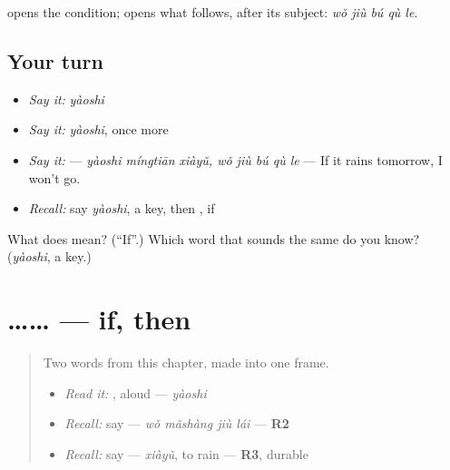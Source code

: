 \begin{grammarlens}[title={What you've built}]
 opens the condition;  opens what follows, after its subject: \textbf{} \emph{wǒ jiù bú qù le}.
\end{grammarlens}

\subsection*{Your turn}
\begin{itemize}
\raggedright
  \item \emph{Say it:} \emph{yàoshi}
  \item \emph{Say it:} \emph{yàoshi}, once more
  \item \emph{Say it:}   — \emph{yàoshi míngtiān xiàyǔ, wǒ jiù bú qù le} — If it rains tomorrow, I won't go.
  \item \emph{Recall:} say \emph{yàoshi}, a key, then , if
\end{itemize}

\begin{tcolorbox}[breakable,colback=teal!4,colframe=teal!35!black,title={Before you move on}]
What does  mean? (\textquotedblleft{}If\textquotedblright{}.) Which word that sounds the same do you know? (\emph{yàoshi}, a key.)
\end{tcolorbox}
\section[\texorpdfstring{\zh{要是}…\zh{就}… (yàoshi … jiù …)}{要是…就… (yàoshi … jiù …)}]{…… — if, then}

\label{lesson:ZH-C288-conditional}



\begin{quote}
Two words from this chapter, made into one frame.

\begin{itemize}
\raggedright
  \item \emph{Read it:} , aloud — \emph{yàoshi}
  \item \emph{Recall:} say  — \emph{wǒ mǎshàng jiù lái} — \textbf{R2}
  \item \emph{Recall:} say  — \emph{xiàyǔ}, to rain — \textbf{R3}, durable
\end{itemize}
\end{quote}

